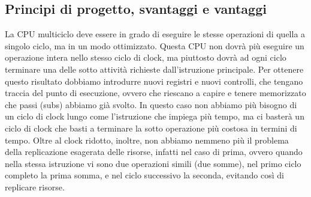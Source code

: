 \documentclass[italian]{article}
\begin{document}
	\subsection{Principi di progetto, svantaggi e vantaggi}
	La CPU multiciclo deve essere in grado di eseguire le stesse operazioni di quella a singolo ciclo, ma in un modo ottimizzato. Questa CPU non dovrà più eseguire un operazione intera nello stesso ciclo di clock, ma piuttosto dovrà ad ogni ciclo terminare una delle sotto attività richieste dall’istruzione principale. Per ottenere questo risultato dobbiamo introdurre nuovi registri e nuovi controlli, che tengano traccia del punto di esecuzione, ovvero che riescano a capire e tenere memorizzato che passi (subs) abbiamo già svolto. In questo caso non abbiamo più bisogno di un ciclo di clock lungo come l’istruzione che impiega più tempo, ma ci basterà un ciclo di clock che basti a terminare la sotto operazione più costosa in termini di tempo. Oltre al clock ridotto, inoltre, non abbiamo nemmeno più il problema della replicazione esagerata delle risorse, infatti nel caso di prima, ovvero quando nella stessa istruzione vi sono due operazioni simili (due somme), nel primo ciclo completo la prima somma, e nel ciclo successivo la seconda, evitando così di replicare risorse.
	
	\newpage
\end{document}
